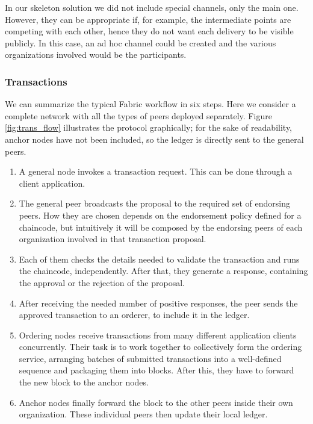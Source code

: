 In our skeleton solution we did not include special channels, only the main one. However, they can be appropriate if, for example, the intermediate points are competing with each other, hence they do not want each delivery to be visible publicly. In this case, an ad hoc channel could be created and the various organizations involved would be the participants.

\subsubsection{Transactions}
We can summarize the typical Fabric workflow in six steps. Here we consider a complete network with all the types of peers deployed separately. Figure \ref{fig:trans_flow} illustrates the protocol graphically; for the sake of readability, anchor nodes have not been included, so the ledger is directly sent to the general peers.

\begin{figure}[htb]
\end{figure}

\begin{enumerate}
    \item A general node invokes a transaction request. This can be done through a client application.
    \item The general peer broadcasts the proposal to the required set of endorsing peers. How they are chosen depends on the endorsement policy defined for a chaincode, but intuitively it will be composed by the endorsing peers of each organization involved in that transaction proposal.
    \item Each of them checks the details needed to validate the transaction and runs the chaincode, independently. After that, they generate a response, containing the approval or the rejection of the proposal. 
    \item After receiving the needed number of positive responses, the peer sends the approved transaction to an orderer, to include it in the ledger.
    \item Ordering nodes receive transactions from many different application clients concurrently. Their task is to work together to collectively form the ordering service, arranging batches of submitted transactions into a well-defined sequence and packaging them into blocks. After this, they have to forward the new block to the anchor nodes.
    \item Anchor nodes finally forward the block to the other peers inside their own organization. These individual peers then update their local ledger.
\end{enumerate}

